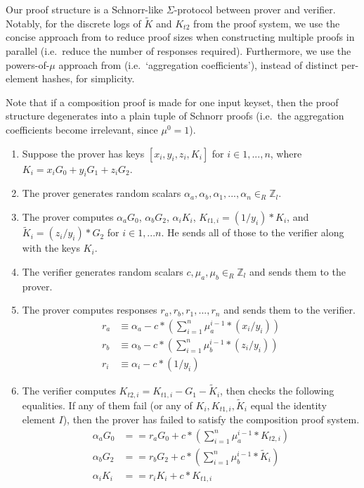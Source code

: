 \begin{appendices}
[[[better terminology than `proof structure'?]

Our proof structure is a Schnorr-like $\Sigma$-protocol between prover and verifier. Notably, for the discrete logs of $\tilde{K}$ and $K_{t2}$ from the proof system, we use the concise approach from \cite{clsag-eprint} to reduce proof sizes when constructing multiple proofs in parallel (i.e.\ reduce the number of responses required). Furthermore, we use the powers-of-$\mu$ approach from \cite{triptych-preprint} (i.e.\ `aggregation coefficients'), instead of distinct per-element hashes, for simplicity.

Note that if a composition proof is made for one input keyset, then the proof structure degenerates into a plain tuple of Schnorr proofs (i.e.\ the aggregation coefficients become irrelevant, since $\mu^0 = 1$).

\begin{enumerate}
    \item Suppose the prover has keys $[x_i, y_i, z_i, K_i]$ for $i \in 1,...,n$, where $K_i = x_i G_0 + y_i G_1 + z_i G_2$.

    \item The prover generates random scalars $\alpha_a, \alpha_b, \alpha_1, ..., \alpha_n \in_R \mathbb{Z}_l$.

    \item The prover computes $\alpha_a G_0$, $\alpha_b G_2$, $\alpha_i K_i$, $K_{t1,i} = (1/y_i)*K_i$, and $\tilde{K}_i = (z_i/y_i)*G_2$ for $i \in 1,...n$. He sends all of those to the verifier along with the keys $K_i$.

    \item The verifier generates random scalars $c, \mu_a, \mu_b \in_R \mathbb{Z}_l$ and sends them to the prover.

    \item The prover computes responses $r_a, r_b, r_1, ..., r_n$ and sends them to the verifier.\vspace{.115cm}
    \begin{align*}
        r_a &\equiv \alpha_a - c*(\sum^n_{i=1} \mu_a^{i-1}*(x_i/y_i)) \\
        r_b &\equiv \alpha_b - c*(\sum^n_{i=1} \mu_b^{i-1}*(z_i/y_i)) \\
        r_i &\equiv \alpha_i - c*(1/y_i)
    \end{align*}

    \item The verifier computes $K_{t2,i} = K_{t1,i} - G_1 - \tilde{K}_i$, then checks the following equalities. If any of them fail (or any of $K_i, K_{t1,i}, \tilde{K}_i$ equal the identity element $I$), then the prover has failed to satisfy the composition proof system.\vspace{.115cm}
    \begin{align*}
        \alpha_a G_0 &== r_a G_0 + c*(\sum^n_{i=1} \mu_a^{i-1}*K_{t2,i}) \\
        \alpha_b G_2 &== r_b G_2 + c*(\sum^n_{i=1} \mu_b^{i-1}*\tilde{K}_i) \\
        \alpha_i K_i &== r_i K_i + c*K_{t1,i}
    \end{align*}
\end{enumerate}

\end{appendices}
